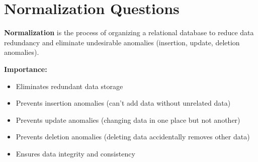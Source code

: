 \documentclass[12pt,a4paper]{article}
\begin{document}
\section{Normalization Questions}

\begin{questionbox}
\end{questionbox}
\begin{answerbox}
\textbf{Normalization} is the process of organizing a relational database to reduce data redundancy and eliminate undesirable anomalies (insertion, update, deletion anomalies).

\textbf{Importance:}
\begin{itemize}[nosep]
    \item Eliminates redundant data storage
    \item Prevents insertion anomalies (can't add data without unrelated data)
    \item Prevents update anomalies (changing data in one place but not another)
    \item Prevents deletion anomalies (deleting data accidentally removes other data)
    \item Ensures data integrity and consistency
\end{itemize}
\end{answerbox}
\end{document}
